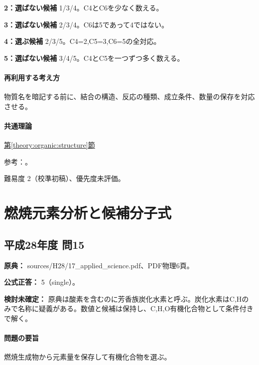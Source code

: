 \noindent\textbf{2：選ばない候補} 1/3/4。C4とC6を少なく数える。\par

\noindent\textbf{3：選ばない候補} 2/3/4。C6は5であって4ではない。\par

\noindent\textbf{4：選ぶ候補} 2/3/5。C4=\allowbreak{}2,C5=\allowbreak{}3,C6=\allowbreak{}5の全対応。\par

\noindent\textbf{5：選ばない候補} 3/4/5。C4とC5を一つずつ多く数える。\par

\paragraph{再利用する考え方} 物質名を暗記する前に、結合の構造、反応の種類、成立条件、数量の保存を対応させる。

\paragraph{共通理論} \hyperref[theory:organic:structure]{第\ref*{theory:organic:structure}節}

\par 参考：\cite{organic_isomers}。

\par 難易度 2（校準初稿）、優先度未評価。

\section{燃焼元素分析と候補分子式}

\subsection{平成28年度 問15}
\label{q:h28-reg-applied-15}

\noindent\textbf{原典：} sources/H28/17\_applied\_science.pdf、PDF物理6頁。

\textbf{公式正答：} 5（single）。

\par\textbf{検討未確定：} 原典は酸素を含むのに芳香族炭化水素と呼ぶ。炭化水素はC,Hのみで名称に疑義がある。数値と候補は保持し、C,H,O有機化合物として条件付きで解く。

\paragraph{問題の要旨} 燃焼生成物から元素量を保存して有機化合物を選ぶ。

